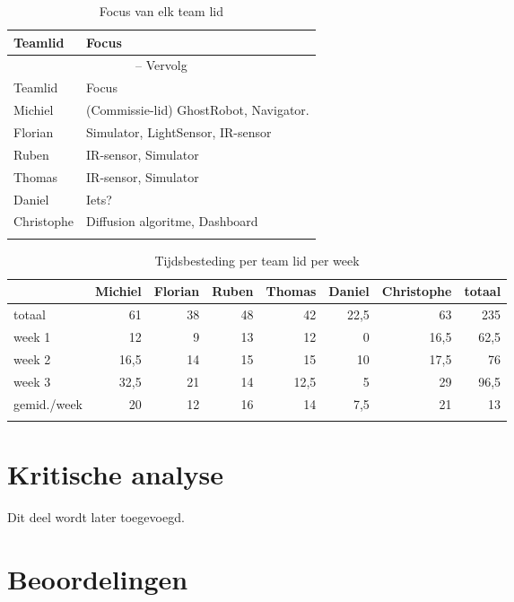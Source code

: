 \documentclass[12pt,a4paper]{report}
\begin{document}
\begin{longtable}{l l}
\caption{Focus van elk team lid} \\ [0.5ex]
\hline\hline
Teamlid & Focus \\ [0.5ex]
\hline 
\endfirsthead
\multicolumn{2}{c}{{\tablename} \thetable{} -- Vervolg} \\[0.5ex]
\hline \hline
Teamlid & Focus \\ [0.5ex]
\hline 
\endhead
Michiel 		& 	(Commissie-lid) GhostRobot, Navigator. \\
Florian 		&	Simulator, LightSensor, IR-sensor\\
Ruben 		&	IR-sensor, Simulator\\
Thomas 		&	IR-sensor, Simulator\\
Daniel 		&	Iets? \\
Christophe 	&	Diffusion algoritme, Dashboard \\
\hline
\label{tab:focus}
\end{longtable}

\begin{longtable}{l r r r r r r r}
\caption{Tijdsbesteding per team lid per week} \\
\hline\hline
 & Michiel & Florian & Ruben & Thomas & Daniel & Christophe & totaal \\
\hline 
\endfirsthead
totaal & 61 & 38 & 48 & 42 & 22,5 & 63 & 235\\
\hline
week 1 & 12 & 9 & 13 & 12 & 0 & 16,5 & 62,5 \\
week 2 & 16,5 & 14 & 15 & 15 & 10 & 17,5 & 76 \\
week 3 & 32,5 & 21 & 14 & 12,5 & 5 & 29 & 96,5 \\
\hline
gemid./week & 20 & 12 & 16 & 14 & 7,5 & 21 & 13 \\
\label{tab:tijdsregistratie}
\end{longtable}

\chapter{Kritische analyse}

Dit deel wordt later toegevoegd.

\appendix

\chapter{Beoordelingen}
\end{document}
